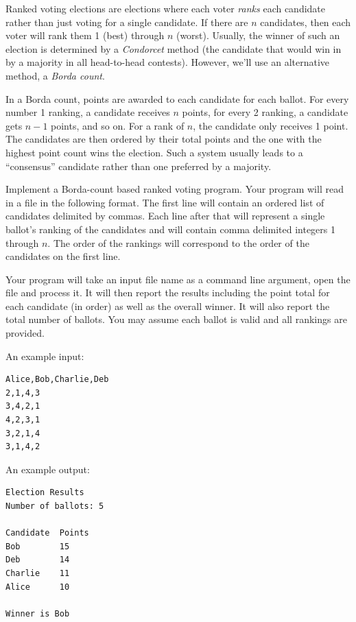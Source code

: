 \begin{exer}
Ranked voting elections are elections where each voter 
\emph{ranks} each candidate rather than just voting for a 
single candidate.  If there are $n$ candidates, then each
voter will rank them 1 (best) through $n$ (worst).  Usually, 
the winner of such an election is determined by a 
\emph{Condorcet} method (the candidate that would
win in by a majority in all head-to-head contests).  
However, we'll use an alternative method, a \emph{Borda count}.

In a Borda count, points are awarded to each candidate 
for each ballot.  For every number 1 ranking, a candidate 
receives $n$ points, for every 2 ranking, a candidate gets 
$n-1$ points, and so on.  For a rank of $n$, the candidate 
only receives 1 point.  The candidates are then ordered by 
their total points and the one with the highest point count 
wins the election.  Such a system usually leads to a 
``consensus'' candidate rather than one preferred by a 
majority.

Implement a Borda-count based ranked voting program.  
Your program will read in a file in the following format.  
The first line will contain an ordered list of candidates 
delimited by commas.  Each line after that will represent 
a single ballot's ranking of the candidates and will contain 
comma delimited integers 1 through $n$.  The order of 
the rankings will correspond to the order of the candidates 
on the first line.

Your program will take an input file name as a command 
line argument, open the file and process it.  It will then 
report the results including the point total for each candidate 
(in order) as well as the overall winner.  It will also report the
total number of ballots.  You may assume each ballot is 
valid and all rankings are provided.

An example input:

\begin{verbatim}
Alice,Bob,Charlie,Deb
2,1,4,3
3,4,2,1
4,2,3,1
3,2,1,4
3,1,4,2
\end{verbatim}

An example output:

\begin{verbatim}
Election Results
Number of ballots: 5

Candidate  Points
Bob        15
Deb   	   14
Charlie    11
Alice      10

Winner is Bob
\end{verbatim}
\end{exer}

